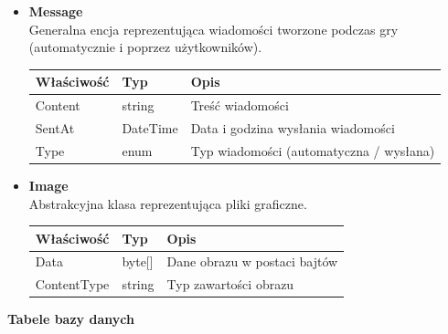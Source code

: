 \documentclass[twoside]{projektInzynierskiMS1}
\begin{document}
\begin{itemize}
    \item \textbf{Message}\\
    Generalna encja reprezentująca wiadomości tworzone podczas gry (automatycznie i poprzez użytkowników).
    \renewcommand{\arraystretch}{1.2}
    \begin{longtable}{|m{4cm}|m{2cm}|m{8cm}|}
        \hline
        \rowcolor{lightgray}
        \textbf{Właściwość} & \textbf{Typ} & \textbf{Opis} \\ \hline
        \endhead
        \hline
        Content & string & Treść wiadomości \\ \hline
        SentAt & DateTime & Data i godzina wysłania wiadomości \\ \hline
        Type & enum & Typ wiadomości (automatyczna / wysłana) \\ \hline
    \end{longtable}

    \item \textbf{Image}\\
    Abstrakcyjna klasa reprezentująca pliki graficzne.
    \renewcommand{\arraystretch}{1.2}
    \begin{longtable}{|m{4cm}|m{2cm}|m{8cm}|}
        \hline
        \rowcolor{lightgray}
        \textbf{Właściwość} & \textbf{Typ} & \textbf{Opis} \\ \hline
        \endhead
        \hline
        Data & byte[] & Dane obrazu w postaci bajtów \\ \hline
        ContentType & string & Typ zawartości obrazu \\ \hline
    \end{longtable}
\end{itemize}

\newpage

\noindent \textbf{Tabele bazy danych}\\
\end{document}
